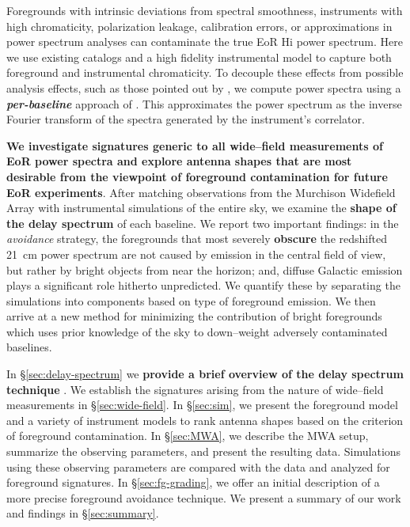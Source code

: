 \documentclass[preprint2,iop,numberedappendix,twocolappendix,appendixfloats]{emulateapj}
\begin{document}
Foregrounds with intrinsic deviations from spectral smoothness, instruments with high chromaticity, polarization leakage, calibration errors, or approximations in power spectrum analyses can contaminate the true EoR H{\sc i} power spectrum. Here we use existing catalogs and a high fidelity instrumental model to capture both foreground and instrumental chromaticity. To decouple these effects from possible analysis effects, such as those pointed out by \citet{haz13}, we compute power spectra using a {\it \textbf{per-baseline}} approach of \citet{par12b}. This approximates the power spectrum as the inverse Fourier transform of the spectra generated by the instrument's correlator. 

{\bf We investigate signatures generic to all wide--field measurements of EoR power spectra and explore antenna shapes that are most desirable from the viewpoint of foreground contamination for future EoR experiments}. After matching observations from the Murchison Widefield Array with instrumental simulations of the entire sky, we examine the {\bf shape of the delay spectrum} of each baseline. We report two important findings: in the {\it avoidance} strategy, the foregrounds that most severely {\bf obscure} the redshifted 21~cm power spectrum are not caused by emission in the central field of view, but rather by bright objects from near the horizon; and, diffuse Galactic emission plays a significant role hitherto unpredicted. We quantify these by separating the simulations into components based on type of foreground emission. We then arrive at a new method for minimizing the contribution of bright foregrounds which uses prior knowledge of the sky to down--weight adversely contaminated baselines. 

In \S\ref{sec:delay-spectrum} we {\bf provide a brief overview of the delay spectrum technique} \citep{par12a,par12b}. We establish the signatures arising from the nature of wide--field measurements in \S\ref{sec:wide-field}. In \S\ref{sec:sim}, we present the foreground model and a variety of instrument models to rank antenna shapes based on the criterion of foreground contamination. In \S\ref{sec:MWA}, we describe the MWA setup, summarize the observing parameters, and present the resulting data. Simulations using these observing parameters are compared with the data and analyzed for foreground signatures. In \S\ref{sec:fg-grading}, we offer an initial description of a more precise foreground avoidance technique. We present a summary of our work and findings in \S\ref{sec:summary}.
\end{document}

